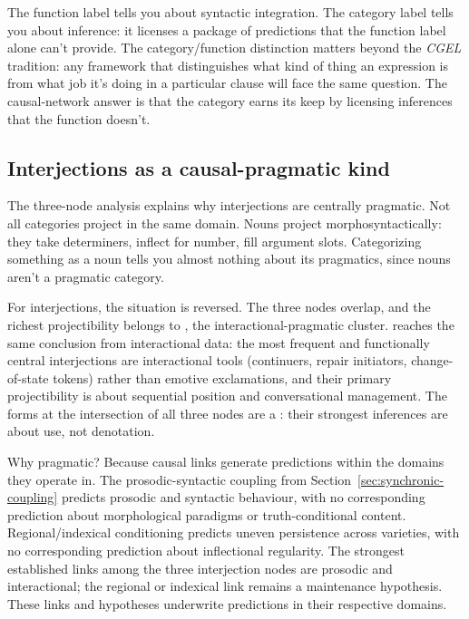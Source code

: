 \documentclass[12pt]{article}
\begin{document}
The function label tells you about syntactic integration. The category
label tells you about inference: it licenses a package of predictions
that the function label alone can't provide. The category/function distinction matters
beyond the \textit{CGEL} tradition: any framework that distinguishes what kind of
thing an expression is from what job it's doing in a particular clause
will face the same question. The causal-network answer is that the
category earns its keep by licensing inferences that the function
doesn't.

\subsection{Interjections as a causal-pragmatic kind}\label{sec:proj-pragmatic}

The three-node analysis explains why interjections are centrally
pragmatic. Not all categories project in the same domain. Nouns project
morphosyntactically: they take determiners, inflect for number, fill
argument slots. Categorizing something as a noun tells you almost
nothing about its pragmatics, since nouns aren't a pragmatic category.

For interjections, the situation is reversed. The three nodes overlap,
and the richest projectibility belongs to
, the interactional-pragmatic
cluster.
\textcite{dingemanse2024} reaches the same conclusion from interactional
data: the most frequent and functionally central interjections are
interactional tools (continuers, repair initiators, change-of-state
tokens) rather than emotive exclamations, and their primary
projectibility is about sequential position and conversational
management. The forms at the intersection of all three nodes are a
: their strongest inferences are about use,
not denotation.

Why pragmatic? Because causal links generate predictions within the
domains they operate in. The prosodic-syntactic coupling from
Section~\ref{sec:synchronic-coupling}
predicts prosodic and syntactic behaviour, with no corresponding
prediction about morphological paradigms or truth-conditional content.
Regional/indexical conditioning predicts uneven persistence across
varieties, with no corresponding prediction about inflectional
regularity. The strongest established links among the three
interjection nodes are prosodic and interactional; the regional or
indexical link remains a maintenance hypothesis. These links and
hypotheses underwrite predictions in their respective domains.
\end{document}
